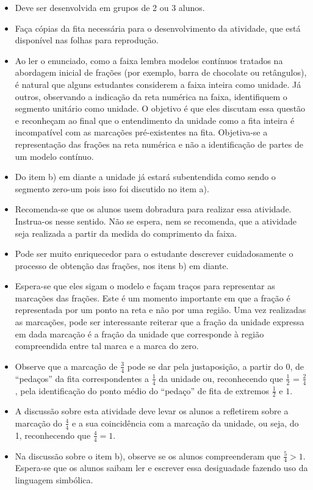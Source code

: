\documentclass[oneside]{book}
\begin{document}
\begin{multicols}{2}
      
\begin{itemize} %
    \item       Deve ser desenvolvida em grupos de 2 ou 3 alunos. 
    \item       Faça cópias da fita necessária para o desenvolvimento da atividade, que está disponível nas folhas para reprodução.
    \item       Ao ler o enunciado, como a faixa lembra modelos contínuos tratados na abordagem inicial de frações (por exemplo, barra de chocolate ou retângulos), é natural que alguns estudantes considerem a faixa inteira como unidade. Já outros, observando a indicação da reta numérica na faixa, identifiquem o segmento unitário como unidade. O objetivo é que eles discutam essa questão e reconheçam ao final que o entendimento da unidade como a fita inteira é incompatível com as marcações pré-existentes na fita. Objetiva-se a representação das frações na reta numérica e não a identificação de partes de um modelo contínuo. 
    \item       Do item b) em diante a unidade já estará subentendida como sendo o segmento zero-um pois isso foi discutido no item a).
    \item       Recomenda-se que os alunos usem dobradura para realizar essa atividade. Instrua-os nesse sentido. Não se espera, nem se recomenda, que a atividade seja realizada a partir da medida do comprimento da faixa.
    \item       Pode ser muito enriquecedor para o estudante descrever cuidadosamente o processo de obtenção das frações, nos itens b) em diante.
    \item       Espera-se que eles sigam o modelo e façam traços para representar as marcações das frações. Este é um momento importante em que a fração é representada por um ponto na reta e não por uma região. Uma vez realizadas as marcações, pode ser interessante reiterar que a fração da unidade expressa em dada marcação é a fração da unidade que corresponde à região compreendida entre tal marca e a marca do zero.
    \item       Observe que a marcação de       $\frac{3}{4}$       pode se dar pela justaposição, a partir do       $0$, de       ``pedaços''       da fita correspondentes a       $\frac{1}{4}$       da unidade ou, reconhecendo que       $\frac{1}{2}$       =       $\frac{2}{4}$, pela identificação do ponto médio do       ``pedaço''       de fita de extremos       $\frac{1}{2}$       e       $1$.    
    \item       A discussão sobre esta atividade deve levar os alunos a refletirem sobre a marcação do       $\frac{4}{4}$       e a sua coincidência com a marcação da unidade, ou seja, do 1, reconhecendo que       $\frac{4}{4}=1$. 
    \item       Na discussão sobre o item b), observe se os alunos compreenderam que       $\frac{5}{4}>1$. Espera-se que os alunos saibam ler e escrever essa desiguadade fazendo uso da linguagem simbólica.  
\end{itemize} %
  


\end{multicols}
\end{document}
